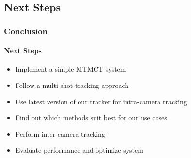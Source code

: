 \subsection{Next Steps}
\begin{frame}
    \frametitle{Conclusion}
    \framesubtitle{Next Steps}

    \begin{itemize}
        \item<1->Implement a simple MTMCT system
              \vspace{5pt}
        \item<2->Follow a multi-shot tracking approach
              \vspace{5pt}
        \item<3->Use latest version of our tracker for intra-camera tracking
              \vspace{5pt}
        \item<4->Find out which methods suit best for our use cases
              \vspace{5pt}
        \item<5->Perform inter-camera tracking
              \vspace{5pt}
        \item<6->Evaluate performance and optimize system
    \end{itemize}
\end{frame}
